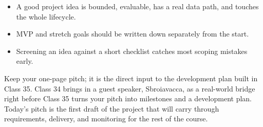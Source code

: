 \classclosingframe
{\begin{itemize}
\item A good project idea is bounded, evaluable, has a real data path, and touches the whole lifecycle.
\item MVP and stretch goals should be written down separately from the start.
\item Screening an idea against a short checklist catches most scoping mistakes early.
\end{itemize}}
{Keep your one-page pitch; it is the direct input to the development plan built in Class 35.}
{Class 34 brings in a guest speaker, Sbroiavacca, as a real-world bridge right before Class 35 turns your pitch into milestones and a development plan.}
{Today's pitch is the first draft of the project that will carry through requirements, delivery, and monitoring for the rest of the course.}


